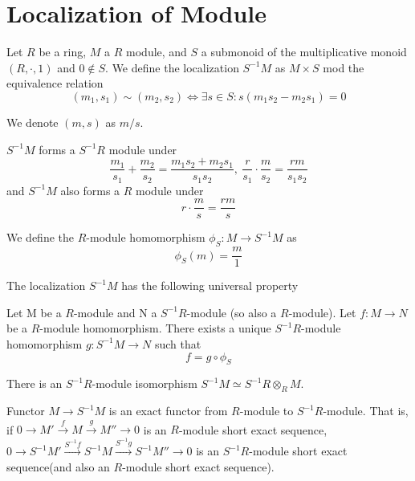 \documentclass[12pt]{book}
\begin{document}
	\section{Localization of Module}
		
	\begin{definition}
		Let $R$ be a ring, $M$ a $R$ module, and $S$ a submonoid of the multiplicative monoid $(R,\cdot,1)$ and $0\notin S$. We define the localization $S^{-1}M$ as $M\times S$ mod the equivalence relation
		\begin{equation}
			(m_1,s_1)\sim (m_2,s_2) \iff \exists s\in S: s(m_1s_2-m_2s_1)=0
		\end{equation}
		
		We denote $(m,s)$ as $m/s$.
	\end{definition}
		
	$S^{-1}M$ forms a $S^{-1}R$ module under 
	\begin{equation}
		\frac {m_1}{s_1}+\frac {m_2}{s_2}=\frac {m_1s_2+m_2s_1}{s_1s_2},\ \frac {r}{s_1}\cdot\frac {m}{s_2}=\frac {rm}{s_1s_2}
	\end{equation}
	and $S^{-1}M$ also forms a $R$ module under
	\begin{equation}
		r\cdot\frac {m}{s}=\frac {rm}{s}
	\end{equation}
	
	\begin{definition}
		We define the $R$-module homomorphism $\phi_S:M\rightarrow S^{-1}M$ as 
		\begin{equation}
			\phi_S(m)=\frac m 1
		\end{equation}
	\end{definition}
	
	The localization $S^{-1}M$ has the following universal property
	\begin{theorem}
		Let M be a $R$-module and N a $S^{-1}R$-module (so also a $R$-module). Let $f:M\rightarrow N$ be a $R$-module homomorphism. There exists a unique $S^{-1}R$-module homomorphism $g:S^{-1}M\rightarrow N$ such that
		\begin{equation}
			f=g\circ \phi_S
		\end{equation}
	\end{theorem}
	
	\begin{lemma}
		There is an $S^{-1}R$-module isomorphism $S^{-1}M\simeq S^{-1}R\otimes_R M$.
	\end{lemma}
	
	\begin{theorem}
		Functor $M\rightarrow S^{-1}M$ is an exact functor from $R$-module to $S^{-1}R$-module. That is, if $0\rightarrow M'\xrightarrow{f} M\xrightarrow{g} M''\rightarrow 0$ is an $R$-module short exact sequence, $0\rightarrow S^{-1}M'\xrightarrow{S^{-1}f} S^{-1}M\xrightarrow{S^{-1}g} S^{-1}M''\rightarrow 0$ is an $S^{-1}R$-module short exact sequence(and also an $R$-module short exact sequence).
	\end{theorem}
	
\end{document}
